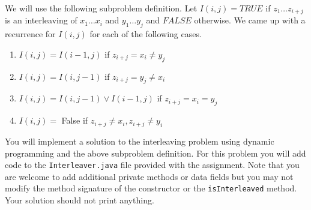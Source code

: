\documentclass[11pt,answers]{exam}
\begin{document}
\begin{questions}
We will use the following subproblem definition.  Let $I(i,j)= TRUE$ if $z_1 \ldots z_{i+j}$ is an interleaving of $x_1 \ldots x_i$ and $y_1 \ldots y_j$ and $FALSE$ otherwise.  We came up with a recurrence for $I(i,j)$ for each of the following cases.\\


\begin{enumerate}
\item $I(i,j) = I(i-1,j)$ if $z_{i+j} = x_i \neq y_j$\\ 
\item $I(i,j) =  I(i,j-1)$ if $ z_{i+j} = y_j \neq x_i$\\ 
\item $I(i,j) = I(i,j-1) \lor I(i-1,j)$  if $z_{i+j} = x_i =y_j$\\ 
\item $I(i,j) = $ False  if $z_{i+j} \neq x_i, z_{i+j} \neq y_i$\\
\end{enumerate}

You will implement a solution to the interleaving problem using dynamic programming and the above subproblem definition. For this problem you will add code to the \texttt{Interleaver.java} file provided with the assignment.  Note that you are welcome to add additional private methods or data fields but you may not modify the method signature of the constructor or the \texttt{isInterleaved} method.  Your solution should not print anything.
\end{questions}
\end{document}
